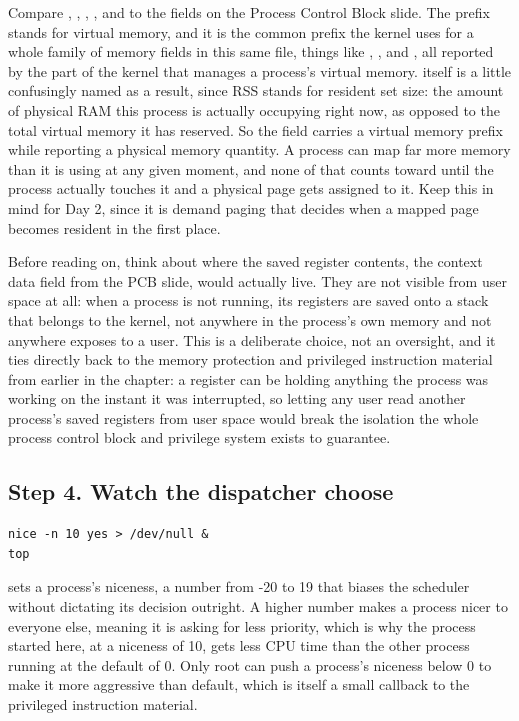 \documentclass[11pt]{article}
\begin{document}
Compare , , , , and  to the fields on the Process Control Block slide. The  prefix stands for virtual memory, and it is the common prefix the kernel uses for a whole family of memory fields in this same file, things like , , and , all reported by the part of the kernel that manages a process's virtual memory.  itself is a little confusingly named as a result, since RSS stands for resident set size: the amount of physical RAM this process is actually occupying right now, as opposed to the total virtual memory it has reserved. So the field carries a virtual memory prefix while reporting a physical memory quantity. A process can map far more memory than it is using at any given moment, and none of that counts toward  until the process actually touches it and a physical page gets assigned to it. Keep this in mind for Day 2, since it is demand paging that decides when a mapped page becomes resident in the first place.

Before reading on, think about where the saved register contents, the context data field from the PCB slide, would actually live. They are not visible from user space at all: when a process is not running, its registers are saved onto a stack that belongs to the kernel, not anywhere in the process's own memory and not anywhere  exposes to a user. This is a deliberate choice, not an oversight, and it ties directly back to the memory protection and privileged instruction material from earlier in the chapter: a register can be holding anything the process was working on the instant it was interrupted, so letting any user read another process's saved registers from user space would break the isolation the whole process control block and privilege system exists to guarantee.

\subsection*{Step 4. Watch the dispatcher choose}

\begin{lstlisting}
nice -n 10 yes > /dev/null &
top
\end{lstlisting}

 sets a process's niceness, a number from -20 to 19 that biases the scheduler without dictating its decision outright. A higher number makes a process nicer to everyone else, meaning it is asking for less priority, which is why the process started here, at a niceness of 10, gets less CPU time than the other  process running at the default of 0. Only root can push a process's niceness below 0 to make it more aggressive than default, which is itself a small callback to the privileged instruction material.
\end{document}
